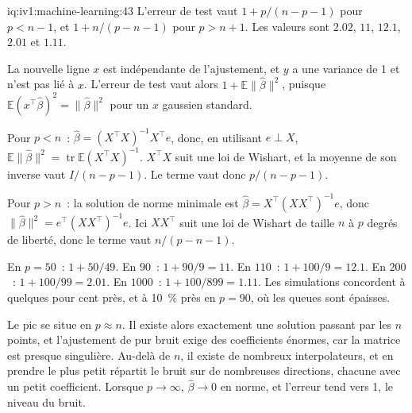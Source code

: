 \begin{solution}{iq:iv1:machine-learning:43}
L'erreur de test vaut $1 + p/(n - p - 1)$ pour $p < n - 1$, et $1 + n/(p - n - 1)$ pour $p > n + 1$. Les valeurs sont $2.02$, $11$, $12.1$, $2.01$ et $1.11$.

La nouvelle ligne $x$ est indépendante de l'ajustement, et $y$ a une variance de 1 et n'est pas lié à $x$. L'erreur de test vaut alors $1 + \mathbb{E}\|\hat{\beta}\|^2$, puisque $\mathbb{E}(x^\top\hat{\beta})^2 = \|\hat{\beta}\|^2$ pour un $x$ gaussien standard.

Pour $p < n$~: $\hat{\beta} = (X^\top X)^{-1}X^\top e$, donc, en utilisant $e \perp X$, $\mathbb{E}\|\hat{\beta}\|^2 = \operatorname{tr}\mathbb{E}(X^\top X)^{-1}$. $X^\top X$ suit une loi de Wishart, et la moyenne de son inverse vaut $I/(n - p - 1)$. Le terme vaut donc $p/(n - p - 1)$.

Pour $p > n$~: la solution de norme minimale est $\hat{\beta} = X^\top(XX^\top)^{-1}e$, donc $\|\hat{\beta}\|^2 = e^\top(XX^\top)^{-1}e$. Ici $XX^\top$ suit une loi de Wishart de taille $n$ à $p$ degrés de liberté, donc le terme vaut $n/(p - n - 1)$.

En $p = 50$~: $1 + 50/49$. En $90$~: $1 + 90/9 = 11$. En $110$~: $1 + 100/9 = 12.1$. En $200$~: $1 + 100/99 = 2.01$. En $1000$~: $1 + 100/899 = 1.11$. Les simulations concordent à quelques pour cent près, et à 10~\% près en $p = 90$, où les queues sont épaisses.

Le pic se situe en $p \approx n$. Il existe alors exactement une solution passant par les $n$ points, et l'ajustement de pur bruit exige des coefficients énormes, car la matrice est presque singulière. Au-delà de $n$, il existe de nombreux interpolateurs, et en prendre le plus petit répartit le bruit sur de nombreuses directions, chacune avec un petit coefficient. Lorsque $p \to \infty$, $\hat{\beta} \to 0$ en norme, et l'erreur tend vers 1, le niveau du bruit.



\end{solution}


